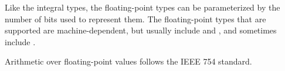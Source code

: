 Like the integral types, the floating-point types can be parameterized
by the number of bits used to represent them.  The floating-point
types that are supported are machine-dependent, but usually include
 and , and sometimes include
.

Arithmetic over floating-point values follows the IEEE 754 standard.
